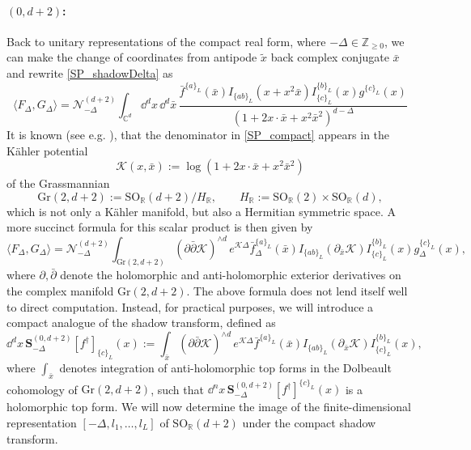 \documentclass{article}
\def \Dg {\Delta}
\def \ds {\partial}
\def \Zs {\mathbb{Z}}
\def \Rs {\mathbb{R}}
\def \Cs {\mathbb{C}}
\begin{document}
\paragraph{$(0,d+2)$:} Back to unitary representations of the compact real form, where $-\Dg \in \Zs_{\geq 0}$, we can make the change of coordinates from antipode $\tilde{x}$ back complex conjugate $\bar{x}$ and rewrite \eqref{SP_shadowDelta} as
     \begin{equation}
         \langle F_{\Dg},G_{\Dg}\rangle = \mathcal{N}_{-\Dg}^{(d+2)} \int_{\Cs^d} \dd^d x \, \dd^d\bar{x}\, \frac{\bar{f}^{\{a\}_L}(\bar{x}) I_{\{ab\}_L}(x+x^2\bar{x}) I_{\{c\}_L}^{\{b\}_L}(x) g^{\{c\}_L}(x)}{(1+2x\cdot \bar{x}+x^2\bar{x}^2)^{d-\Delta}}
         \label{SP_compact}
     \end{equation}
     It is known (see e.g. \cite[Eq.~2.48]{delduc1985classical}), that the denominator in \eqref{SP_compact} appears in the Kähler potential
     \begin{equation}
         \mathcal{K}(x,\bar{x}) := \log(1+2x\cdot\bar{x}+x^2\bar{x}^2)
     \end{equation}
     of the Grassmannian 
     \begin{equation}
         \mathrm{Gr}(2,d+2) := \mathrm{SO}_{\Rs}(d+2)/H_{\Rs}, \qquad H_{\Rs}:=\mathrm{SO}_{\Rs}(2) \times \mathrm{SO}_{\Rs}(d),
         \label{grass_K}
     \end{equation}
     which is not only a Kähler manifold, but also a Hermitian symmetric space. A more succinct formula for this scalar product is then given by
        \begin{equation}
         \langle F_{\Dg},G_{\Dg}\rangle = \mathcal{N}_{-\Dg}^{(d+2)} \int_{\mathrm{Gr}(2,d+2)} (\ds\bar{\ds} \mathcal{K})^{\wedge d} \,e^{\mathcal{K} \Delta} \bar{f}_{\Dg}^{\{a\}_L}(\bar{x}) I_{\{ab\}_L}(\ds_{\bar{x}} \mathcal{K}) I_{\{c\}_L}^{\{b\}_L}(x) g_{\Dg}^{\{c\}_L}(x),
         \label{SP_Kaehler}
     \end{equation}
     where $\ds,\bar{\ds}$ denote the holomorphic and anti-holomorphic exterior derivatives on the complex manifold $\mathrm{Gr}(2,d+2)$. The above formula does not lend itself well to direct computation. Instead, for practical purposes, we will introduce a compact analogue of the shadow transform, defined as
     \begin{equation}
         \dd^d x \, \mathbf{S}^{(0,d+2)}_{-\Dg}[f^{\dagger}]_{\{c\}_L}(x) := \int_{\bar{x}} (\ds\bar{\ds} \mathcal{K})^{\wedge d} \,e^{\mathcal{K} \Delta} \bar{f}^{\{a\}_L}(\bar{x}) I_{\{ab\}_L}(\ds_{\bar{x}} \mathcal{K})I^{\{b\}_L}_{\{c\}_L}(x),
         \label{S_holo}
     \end{equation}
     where $\int_{\bar{x}}$ denotes integration of anti-holomorphic top forms in the Dolbeault cohomology of $\mathrm{Gr}(2,d+2)$, such that $\dd^n x\,\mathbf{S}^{(0,d+2)}_{-\Dg}[f^{\dagger}]^{\{c\}_L}(x)$ is a holomorphic top form. We will now determine the image of the finite-dimensional representation $[-\Dg,l_1,\dots,l_L]$ of $\mathrm{SO}_{\Rs}(d+2)$ under the compact shadow transform. 
     
\end{document}
